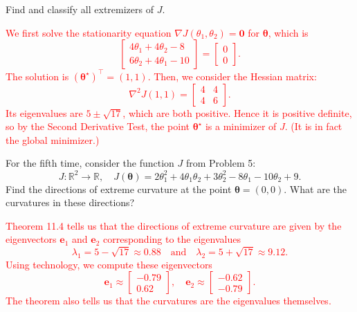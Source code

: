 \documentclass[12pt,reqno]{amsart}
\begin{document}
Find and classify all extremizers of $J$.

\bigskip
\textcolor{red}{We first solve the stationarity equation $\nabla J(\theta_1,\theta_2)=\boldsymbol{0}$ for $\boldsymbol{\theta}$, which is
	\[\begin{bmatrix}
	4\theta_1 + 4\theta_2 -8 \\
	6\theta_2 + 4\theta_1-10
	\end{bmatrix} = \begin{bmatrix}
	0 \\ 0
	\end{bmatrix}.
	\]
The solution is $(\boldsymbol{\theta}^\star)^\intercal = (1,1)$. Then, we consider the Hessian matrix:
	\[\nabla^2 J(1,1) = \begin{bmatrix} 4 & 4 \\ 4 & 6 \end{bmatrix}.
	\]
Its eigenvalues are $5 \pm \sqrt{17}$, which are both positive. Hence it is positive definite, so by the Second Derivative Test, the point $\boldsymbol{\theta}^\star$ is a minimizer of $J$. (It is in fact the global minimizer.)}
\bigskip










\prob For the fifth time, consider the function $J$ from Problem 5:
	\[J: \mathbb{R}^2 \to \mathbb{R}, \quad J(\boldsymbol{\theta}) = 2\theta_1^2 + 4\theta_1\theta_2 + 3\theta_2^2 -8\theta_1 - 10\theta_2 + 9.
	\]
Find the directions of extreme curvature at the point $\boldsymbol{\theta} = (0,0)$. What are the curvatures in these directions?

\bigskip
\textcolor{red}{Theorem 11.4 tells us that the directions of extreme curvature are given by the eigenvectors $\mathbf{e}_1$ and $\mathbf{e}_2$ corresponding to the eigenvalues
	\[\lambda_1 = 5 - \sqrt{17} \approx 0.88 \quad \text{and} \quad \lambda_2 = 5 + \sqrt{17} \approx 9.12.
	\]
Using technology, we compute these eigenvectors
	\[\mathbf{e}_1 \approx \begin{bmatrix}
	-0.79 \\ 0.62
	\end{bmatrix}, \quad
	\mathbf{e}_2 \approx \begin{bmatrix}
	-0.62 \\ -0.79
	\end{bmatrix}.
	\]
The theorem also tells us that the curvatures are the eigenvalues themselves.}
\bigskip
\end{document}

